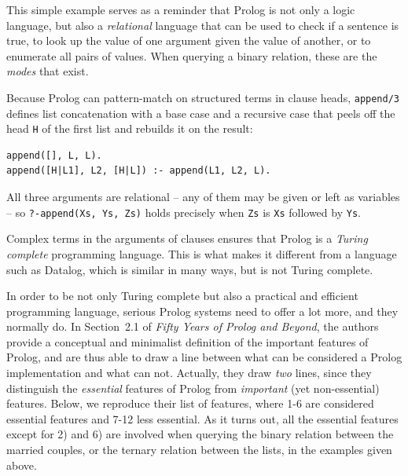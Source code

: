 \noindent This simple example serves as a reminder that Prolog is not only a logic language, but also a \textit{relational} language that can be used to check if a sentence is true, to look up the value of one argument given the value of another, or to enumerate all pairs of values. When querying a binary relation, these are the \textit{modes} that exist.


Because Prolog can pattern-match on structured terms in clause heads, \texttt{append/3} defines list concatenation with a base case and a recursive case that peels off the head \texttt{H} of the first list and rebuilds it on the result:

\begin{verbatim}
append([], L, L).
append([H|L1], L2, [H|L]) :- append(L1, L2, L).            
\end{verbatim}


\noindent All three arguments are relational -- any of them may be given or left as variables -- so \texttt{?-append(Xs,\,Ys,\,Zs)} holds precisely when \texttt{Zs} is \texttt{Xs} followed by \texttt{Ys}.

Complex terms in the arguments of clauses ensures that Prolog is a \textit{Turing complete} programming language. This is what makes it different from a language such as Datalog, which is similar in many ways, but is not Turing complete.

In order to be not only Turing complete but also a practical and efficient programming language, serious Prolog systems need to offer a lot more, and they normally do. In Section~2.1 of \textit{Fifty Years of Prolog and Beyond}, the authors provide a conceptual and minimalist definition of the important features of Prolog, and are thus able to draw a line between what can be considered a Prolog implementation and what can not. Actually, they draw \textit{two} lines, since they distinguish the \textit{essential} features of Prolog from \textit{important} (yet non-essential) features. Below, we reproduce their list of features, where 1-6 are considered essential features and 7-12 less essential. As it turns out, all the essential features except for 2) and 6) are involved when querying the binary relation between the married couples, or the ternary relation between the lists, in the examples given above.

